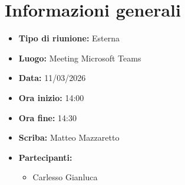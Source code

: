 \section{Informazioni generali}

\begin{itemize} 
    \item \textbf{Tipo di riunione:} Esterna
    \item \textbf{Luogo:} Meeting Microsoft Teams 
    \item \textbf{Data:} 11/03/2026
    \item \textbf{Ora inizio:} 14:00
    \item \textbf{Ora fine:} 14:30 
    \item \textbf{Scriba:} Matteo Mazzaretto
    \item \textbf{Partecipanti:}
    \begin{itemize}[itemsep=0pt, parsep=1pt, label=--]
        \item Carlesso Gianluca
    \end{itemize}
\end{itemize}